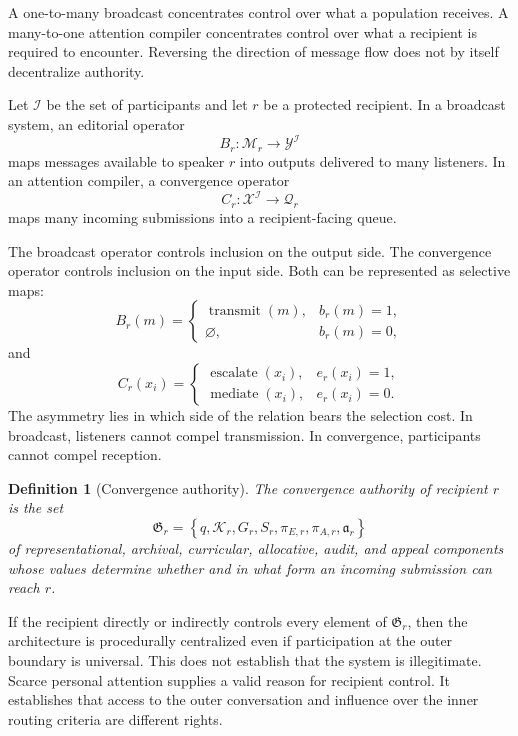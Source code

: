 \documentclass[11pt]{article}
\newtheorem{definition}{Definition}[section]
\theoremstyle{definition}
\newcommand{\K}{\mathcal{K}}
\begin{document}
A one-to-many broadcast concentrates control over what a population receives. A many-to-one attention compiler concentrates control over what a recipient is required to encounter. Reversing the direction of message flow does not by itself decentralize authority.

Let \(\mathcal{I}\) be the set of participants and let \(r\) be a protected recipient. In a broadcast system, an editorial operator
\[
B_r:
\mathcal{M}_r
\to
\mathcal{Y}^{\mathcal{I}}
\]
maps messages available to speaker \(r\) into outputs delivered to many listeners. In an attention compiler, a convergence operator
\[
C_r:
\mathcal{X}^{\mathcal{I}}
\to
\mathcal{Q}_r
\]
maps many incoming submissions into a recipient-facing queue.

The broadcast operator controls inclusion on the output side. The convergence operator controls inclusion on the input side. Both can be represented as selective maps:
\[
B_r(m)=
\begin{cases}
\operatorname{transmit}(m),&b_r(m)=1,\\
\varnothing,&b_r(m)=0,
\end{cases}
\]
and
\[
C_r(x_i)=
\begin{cases}
\operatorname{escalate}(x_i),&e_r(x_i)=1,\\
\operatorname{mediate}(x_i),&e_r(x_i)=0.
\end{cases}
\]
The asymmetry lies in which side of the relation bears the selection cost. In broadcast, listeners cannot compel transmission. In convergence, participants cannot compel reception.

\begin{definition}[Convergence authority]
The convergence authority of recipient \(r\) is the set
\[
\mathfrak{G}_r
=
\left\{
q,\K_r,G_r,S_r,\pi_{E,r},\pi_{A,r},\mathfrak{a}_r
\right\}
\]
of representational, archival, curricular, allocative, audit, and appeal components whose values determine whether and in what form an incoming submission can reach \(r\).
\end{definition}

If the recipient directly or indirectly controls every element of \(\mathfrak{G}_r\), then the architecture is procedurally centralized even if participation at the outer boundary is universal. This does not establish that the system is illegitimate. Scarce personal attention supplies a valid reason for recipient control. It establishes that access to the outer conversation and influence over the inner routing criteria are different rights.
\end{document}
